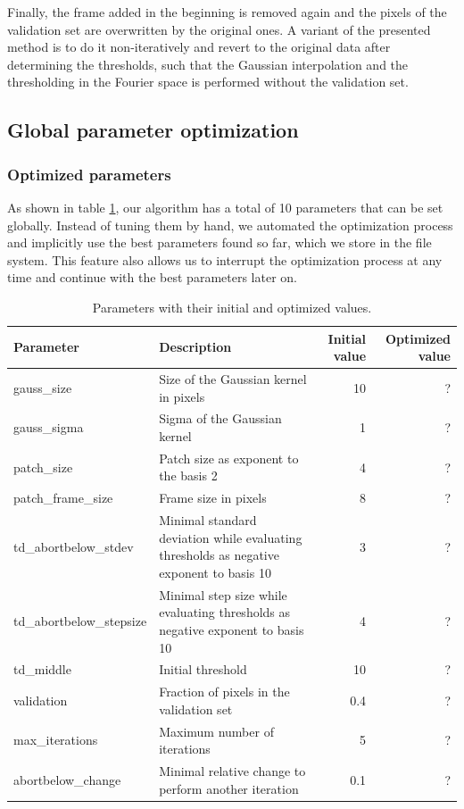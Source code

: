 \documentclass[10pt,conference,compsocconf]{IEEEtran}
\begin{document}
Finally, the frame added in the beginning is removed again and the pixels of the validation set are overwritten by the original ones. A variant of the presented method is to do it non-iteratively and revert to the original data after determining the thresholds, such that the Gaussian interpolation and the thresholding in the Fourier space is performed without the validation set.

\subsection{Global parameter optimization}
\subsubsection{Optimized parameters}
As shown in table \ref{parameters}, our algorithm has a total of 10 parameters that can be set globally. Instead of tuning them by hand, we automated the optimization process and implicitly use the best parameters found so far, which we store in the file system. This feature also allows us to interrupt the optimization process at any time and continue with the best parameters later on.

\begin{table}
\begin{center}
\begin{tabular}{|l|p{6cm}|r|r|}
\hline
Parameter & Description & Initial value & Optimized value\\
\hline
gauss\_size & Size of the Gaussian kernel in pixels & 10 & ? \\
gauss\_sigma & Sigma of the Gaussian kernel & 1 & ? \\
patch\_size & Patch size as exponent to the basis 2 & 4 & ? \\
patch\_frame\_size & Frame size in pixels & 8 & ? \\
td\_abortbelow\_stdev & Minimal standard deviation while evaluating thresholds as negative exponent to basis 10& 3 & ? \\
td\_abortbelow\_stepsize & Minimal step size while evaluating thresholds as negative exponent to basis 10& 4 & ? \\
td\_middle & Initial threshold & 10 & ? \\
validation & Fraction of pixels in the validation set & 0.4 & ? \\
max\_iterations & Maximum number of iterations & 5 & ? \\
abortbelow\_change & Minimal relative change to perform another iteration & 0.1 & ? \\
\hline
\end{tabular}
\end{center}
\caption{Parameters with their initial and optimized values.}
\label{parameters}
\end{table}
\end{document}
